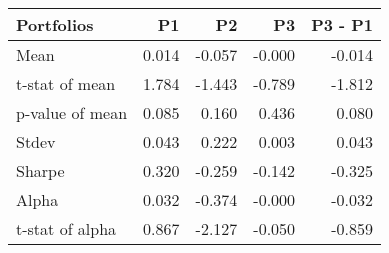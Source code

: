 \begin{tabular}{lrrrr}
\toprule
Portfolios & P1 & P2 & P3 & P3 - P1 \\
\midrule
Mean & 0.014 & -0.057 & -0.000 & -0.014 \\
t-stat of mean & 1.784 & -1.443 & -0.789 & -1.812 \\
p-value of mean & 0.085 & 0.160 & 0.436 & 0.080 \\
Stdev & 0.043 & 0.222 & 0.003 & 0.043 \\
Sharpe & 0.320 & -0.259 & -0.142 & -0.325 \\
Alpha & 0.032 & -0.374 & -0.000 & -0.032 \\
t-stat of alpha & 0.867 & -2.127 & -0.050 & -0.859 \\
\bottomrule
\end{tabular}
